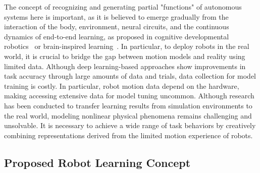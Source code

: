 The concept of recognizing and generating partial "functions" of autonomous systems here is important, as it is believed to emerge gradually from the interaction of the body, environment, neural circuits, and the continuous dynamics of end-to-end learning, as proposed in cognitive developmental robotics~\cite{Asada2015} or brain-inspired learning~\cite{Haruno2001}. In particular, to deploy robots in the real world, it is crucial to bridge the gap between motion models and reality using limited data. Although deep learning-based approaches show improvements in task accuracy through large amounts of data and trials, data collection for model training is costly. In particular, robot motion data depend on the hardware, making accessing extensive data for model tuning uncommon. Although research has been conducted to transfer learning results from simulation environments to the real world, modeling nonlinear physical phenomena remains challenging and unsolvable. It is necessary to achieve a wide range of task behaviors by creatively combining representations derived from the limited motion experience of robots.



\subsection{Proposed Robot Learning Concept}

